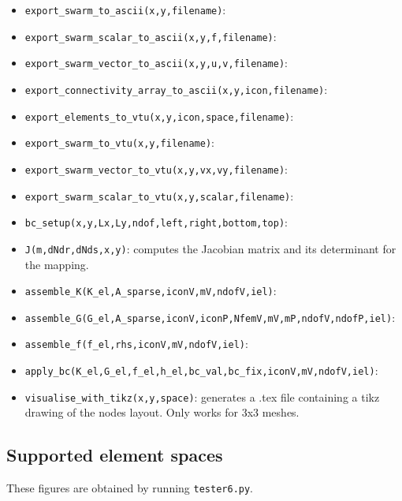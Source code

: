 \begin{itemize}
\begin{itemize}
\item \lstinline{export_swarm_to_ascii(x,y,filename)}:
\item \lstinline{export_swarm_scalar_to_ascii(x,y,f,filename)}:
\item \lstinline{export_swarm_vector_to_ascii(x,y,u,v,filename)}:
\item \lstinline{export_connectivity_array_to_ascii(x,y,icon,filename)}:
\item \lstinline{export_elements_to_vtu(x,y,icon,space,filename)}:
\item \lstinline{export_swarm_to_vtu(x,y,filename)}:
\item \lstinline{export_swarm_vector_to_vtu(x,y,vx,vy,filename)}:
\item \lstinline{export_swarm_scalar_to_vtu(x,y,scalar,filename)}:
\item \lstinline{bc_setup(x,y,Lx,Ly,ndof,left,right,bottom,top)}:
\item \lstinline{J(m,dNdr,dNds,x,y)}: computes the Jacobian matrix and its determinant 
for the mapping. 
\item \lstinline{assemble_K(K_el,A_sparse,iconV,mV,ndofV,iel)}:
\item \lstinline{assemble_G(G_el,A_sparse,iconV,iconP,NfemV,mV,mP,ndofV,ndofP,iel)}:
\item \lstinline{assemble_f(f_el,rhs,iconV,mV,ndofV,iel)}:
\item \lstinline{apply_bc(K_el,G_el,f_el,h_el,bc_val,bc_fix,iconV,mV,ndofV,iel)}:
\item \lstinline{visualise_with_tikz(x,y,space)}: generates a .tex file containing 
a tikz drawing of the nodes layout. Only works for 3x3 meshes. 
\end{itemize}

\end{itemize}

\newpage
\subsection*{Supported element spaces}

These figures are obtained by running \lstinline{tester6.py}.

